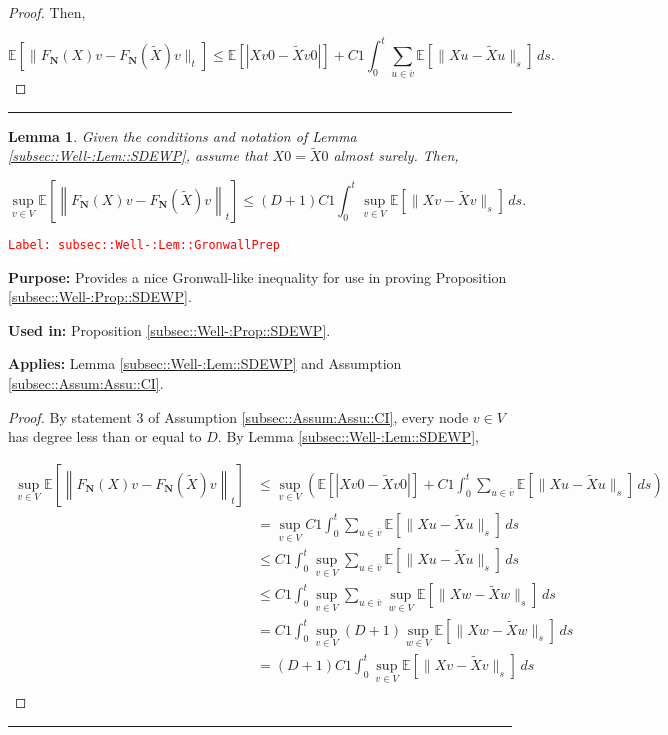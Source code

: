 \documentclass[12pt]{article}
\newcommand{\mb}{\mathbb}
\newcommand{\ov}{\overline}
\newcommand{\tr}{\textcolor{red}}
\newcommand{\labe}[1]{\tr{\texttt{Label: #1}}}
\newcommand{\purpose}{\textbf{Purpose: }}
\newcommand{\usein}{\textbf{Used in: }}
\newcommand{\app}{\textbf{Applies: }}
\newcommand{\lin}{\rule{\linewidth}{0.4 pt}}
\newcommand{\ex}[1]{\mb{E}\left[#1\right]}			%
\renewcommand{\v}{v}							%
\newcommand{\vv}{u}								%
\newcommand{\vvv}{w}							%
\renewcommand{\t}{t}							%
\renewcommand{\tt}{s}							%
\newcommand{\X}{X}								%
\newcommand{\cl}{\ov}							%
\newcommand{\const}{C}							%
\newcommand{\degr}{D}							%
\newcommand{\poisses}{\mathbf{N}}				%
\newcommand{\Fpo}{F_{\poisses}}					%
\newcommand{\alt}[1]{\widetilde{#1}}			%
\newtheorem{lem}[thms]{Lemma}
\begin{document}
\begin{proof}
Then,

\[\ex{\|\Fpo(\X{}{}){\v} - \Fpo(\alt{\X}){\v}\|_\t} \leq \ex{|\X{\v}{0} - \alt{\X}{\v}{0}|} +  \const{1}\int_0^\t \sum_{\vv\in \cl{\v}} \ex{\|\X{\vv}{} - \alt{\X}{\vv}{}\|_\tt}\,d\tt.\]

\end{proof}

\lin

\begin{lem}
Given the conditions and notation of Lemma \ref{subsec::Well-:Lem::SDEWP}, assume that \(\X{}{0} = \alt{\X}{}{0}\) almost surely. Then,

\[\sup_{\v \in V} \ex{\left\|\Fpo(\X{}{}){\v} - \Fpo(\alt{\X}{}{}){\v}\right\|_\t} \leq (\degr+1)\const{1}\int_0^\t \sup_{\v \in V} \ex{\|\X{\v}{} - \alt{\X}{\v}{}\|_\tt}\,d\tt.\]
\label{subsec::Well-:Lem::GronwallPrep}
\end{lem}
\labe{subsec::Well-:Lem::GronwallPrep}

\purpose Provides a nice Gronwall-like inequality for use in proving Proposition \ref{subsec::Well-:Prop::SDEWP}.

\usein Proposition \ref{subsec::Well-:Prop::SDEWP}.

\app Lemma \ref{subsec::Well-:Lem::SDEWP} and Assumption \ref{subsec::Assum:Assu::CI}.

\begin{proof}
By statement 3 of Assumption \ref{subsec::Assum:Assu::CI}, every node \(v \in V\) has degree less than or equal to \(\degr\). By Lemma \ref{subsec::Well-:Lem::SDEWP},

\begin{align*}
\sup_{\v \in V} \ex{\left\|\Fpo(\X{}{}){\v} - \Fpo(\alt{\X}{}{}){\v}\right\|_\t} &\leq \sup_{\v\in V}\left(\ex{|\X{\v}{0} - \alt{\X}{\v}{0}|} +  \const{1}\int_0^\t \sum_{\vv\in \cl{\v}} \ex{\|\X{\vv}{} - \alt{\X}{\vv}{}\|_\tt}\,d\tt\right)\\
&=\sup_{\v \in V} \const{1}\int_0^\t \sum_{\vv \in \cl{\v}} \ex{\|\X{\vv}{} - \alt{\X}{\vv}{}\|_\tt}\,d\tt\\
&\leq \const{1}\int_0^\t \sup_{\v \in V}\sum_{\vv \in \cl{\v}} \ex{\|\X{\vv}{} - \alt{\X}{\vv}{}\|_\tt}\,d\tt\\
&\leq \const{1}\int_0^\t \sup_{\v \in V}\sum_{\vv \in \cl{\v}}\sup_{\vvv\in V} \ex{\|\X{\vvv}{} - \alt{\X}{\vvv}{}\|_\tt}\,d\tt\\
&= \const{1}\int_0^\t \sup_{\v \in V}(\degr+1)\sup_{\vvv\in V} \ex{\|\X{\vvv}{} - \alt{\X}{\vvv}{}\|_\tt}\,d\tt\\
&= (\degr+1)\const{1}\int_0^\t \sup_{\v\in V} \ex{\|\X{\v}{} - \alt{\X}{\v}{}\|_\tt}\,d\tt\\
\end{align*}
\end{proof}
\lin
\end{document}
